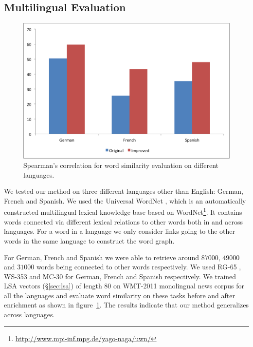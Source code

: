 \documentclass[11pt]{article}
\begin{document}
\subsection{Multilingual Evaluation}
\label{sec:multilingual}

\begin{figure}[!tb]
  \centering
  \includegraphics[width=\columnwidth]{multilingual.png}
  \caption{Spearman's correlation for word similarity evaluation on different languages.}
  \label{fig:multi-lang}
\end{figure}

We tested our method on three different languages other than English: German,
French and Spanish. We used the Universal WordNet \cite{deMeloWeikum2009}, which 
is an automatically constructed multilingual lexical knowledge base based on 
WordNet\footnote{\url{http://www.mpi-inf.mpg.de/yago-naga/uwn/}}. 
It contains words connected via different lexical relations to other words both
in and across languages. For a word in a language we only consider links going to
the other words in the same language to construct the word graph.

For German, French and Spanish we were able to retrieve around $87000$, $49000$
and $31000$ words being connected to other words respectively. We used 
RG-65 \cite{Gurevych:2005:USC:2145899.2145986}, WS-353 \cite{Joubarne:2011:CSS:2018192.2018218} 
and MC-30 \cite{Hassan:2009:CSR:1699648.1699665} for German, French and Spanish respectively. 
We trained LSA vectors (\S\ref{sec:lsa}) of length $80$ on WMT-2011 monolingual news corpus for all the 
languages and evaluate word similarity on these tasks before and after enrichment as 
shown in figure~\ref{fig:multi-lang}. The results indicate that our method generalizes across languages.
\end{document}

